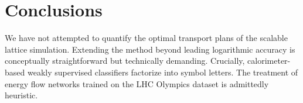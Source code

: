 \section{Conclusions}\label{sec:conclusions}

We have not attempted to quantify the optimal transport plans of the
scalable lattice simulation. Extending the method beyond leading
logarithmic accuracy is conceptually straightforward but technically
demanding. Crucially, calorimeter-based weakly supervised classifiers
factorize into symbol letters. The treatment of energy flow networks
trained on the LHC Olympics dataset is admittedly heuristic.

